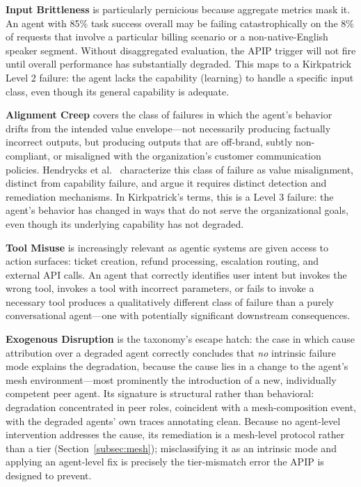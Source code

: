 \textbf{Input Brittleness} is particularly pernicious because aggregate metrics
mask it. An agent with 85\% task success overall may be failing catastrophically
on the 8\% of requests that involve a particular billing scenario or a
non-native-English speaker segment. Without disaggregated evaluation, the APIP
trigger will not fire until overall performance has substantially degraded.
This maps to a Kirkpatrick Level 2 failure: the agent lacks the capability
(learning) to handle a specific input class, even though its general capability
is adequate.

\textbf{Alignment Creep} covers the class of failures in which the agent's
behavior drifts from the intended value envelope---not necessarily producing
factually incorrect outputs, but producing outputs that are off-brand, subtly
non-compliant, or misaligned with the organization's customer communication
policies. Hendrycks et al.~\cite{hendrycks2021values} characterize this class
of failure as value misalignment, distinct from capability failure, and argue
it requires distinct detection and remediation mechanisms. In Kirkpatrick's
terms, this is a Level 3 failure: the agent's behavior has changed in ways that
do not serve the organizational goals, even though its underlying capability
has not degraded.

\textbf{Tool Misuse} is increasingly relevant as agentic systems are given
access to action surfaces: ticket creation, refund processing, escalation
routing, and external API calls. An agent that correctly identifies user intent
but invokes the wrong tool, invokes a tool with incorrect parameters, or fails
to invoke a necessary tool produces a qualitatively different class of failure
than a purely conversational agent---one with potentially significant downstream
consequences.

\textbf{Exogenous Disruption} is the taxonomy's escape hatch: the case in which
cause attribution over a degraded agent correctly concludes that \emph{no}
intrinsic failure mode explains the degradation, because the cause lies in a
change to the agent's mesh environment---most prominently the introduction of a
new, individually competent peer agent. Its signature is structural rather than
behavioral: degradation concentrated in peer roles, coincident with a
mesh-composition event, with the degraded agents' own traces annotating clean.
Because no agent-level intervention addresses the cause, its remediation is a
mesh-level protocol rather than a tier
(Section~\ref{subsec:mesh}); misclassifying it as an intrinsic mode and
applying an agent-level fix is precisely the tier-mismatch error the APIP is
designed to prevent.

